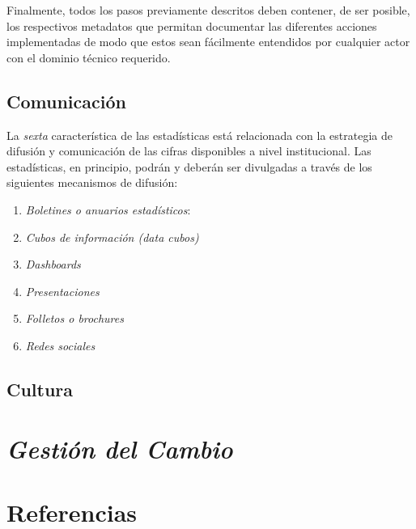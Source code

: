 \documentclass[
]{book}
\providecommand{\tightlist}{%
  \setlength{\itemsep}{0pt}\setlength{\parskip}{0pt}}
\begin{document}
Finalmente, todos los pasos previamente descritos deben contener, de ser posible, los respectivos metadatos que permitan documentar las diferentes acciones implementadas de modo que estos sean fácilmente entendidos por cualquier actor con el dominio técnico requerido.

\hypertarget{comunicaciuxf3n}{%
\section{Comunicación}\label{comunicaciuxf3n}}

La \emph{sexta} característica de las estadísticas está relacionada con la estrategia de difusión y comunicación de las cifras disponibles a nivel institucional. Las estadísticas, en principio, podrán y deberán ser divulgadas a través de los siguientes mecanismos de difusión:

\begin{enumerate}
\def\labelenumi{\arabic{enumi}.}
\tightlist
\item
  \emph{Boletines o anuarios estadísticos}:
\item
  \emph{Cubos de información (data cubos)}
\item
  \emph{Dashboards}
\item
  \emph{Presentaciones}
\item
  \emph{Folletos o brochures}
\item
  \emph{Redes sociales}
\end{enumerate}

\hypertarget{cultura}{%
\section{Cultura}\label{cultura}}

\hypertarget{gestiuxf3n-del-cambio}{%
\chapter{\texorpdfstring{\textbf{\emph{Gestión del Cambio}}}{Gestión del Cambio}}\label{gestiuxf3n-del-cambio}}

\hypertarget{referencias}{%
\chapter*{Referencias}\label{referencias}}

  
\end{document}
